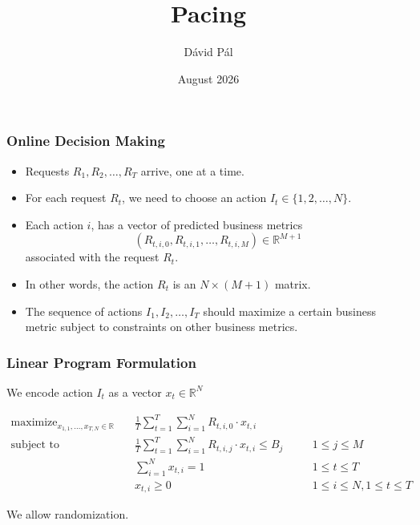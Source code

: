 \documentclass[usenames,dvipsnames]{beamer}
\title{Pacing}
\date{August 2026}
\author{D\'avid P\'al}
\institute{Uber, Sunnyvale}
\DeclareMathOperator*{\maximize}{maximize}
\DeclareMathOperator*{\subjectto}{subject\ to}
\newcommand{\R}{\mathbb{R}}
\begin{document}
\begin{frame}
\maketitle
\end{frame}

\begin{frame}
\frametitle{Online Decision Making}

\begin{itemize}
\item Requests $R_1, R_2, \dots, R_T$ arrive, one at a time.
\item For each request $R_t$, we need to choose an action $I_t \in \{1,2,\dots,N\}$.
\item Each action $i$, has a vector of predicted business metrics
$$
(R_{t,i,0}, R_{t,i,1}, \dots, R_{t,i,M}) \in \R^{M+1}
$$
associated with the request $R_t$.
\item In other words, the action $R_t$ is an $N \times (M+1)$ matrix.
\item The sequence of actions $I_1, I_2, \dots, I_T$ should maximize a
certain business metric subject to constraints on other business metrics.
\end{itemize}
\end{frame}

\begin{frame}
\frametitle{Linear Program Formulation}

We encode action $I_t$ as a vector $x_t \in \R^N$

\begin{align*}
\maximize_{x_{1,1}, \dots, x_{T,N} \in \R} \quad & \frac{1}{T} \sum_{t=1}^T \sum_{i=1}^N R_{t,i,0} \cdot x_{t,i} \\
\subjectto \quad & \frac{1}{T} \sum_{t=1}^T \sum_{i=1}^N R_{t,i,j} \cdot x_{t,i} \le B_j && \quad 1 \le j \le M \\
& \sum_{i=1}^N x_{t,i} = 1 && \quad 1 \le t \le T \\
& x_{t,i} \ge 0 && \quad 1 \le i \le N, 1 \le t \le T
\end{align*}

We allow randomization.
\end{frame}
\end{document}
